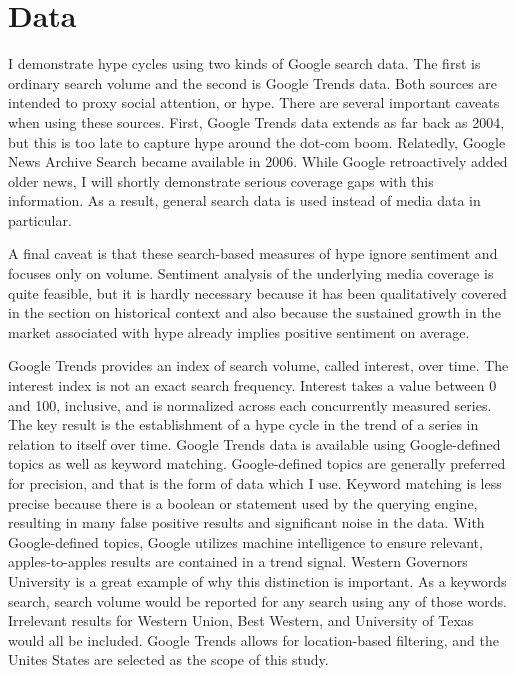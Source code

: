 \documentclass[review]{elsarticle}
\begin{document}
\section{Data}

I demonstrate hype cycles using two kinds of Google search data.
The first is ordinary search volume and the second is Google Trends data.
Both sources are intended to proxy social attention, or hype.
There are several important caveats when using these sources.
First, Google Trends data extends as far back as 2004,
but this is too late to capture hype around the dot-com boom.
Relatedly, Google News Archive Search became available in 2006.
While Google retroactively added older news, I will shortly demonstrate serious coverage gaps with this information.
As a result, general search data is used instead of media data in particular.

A final caveat is that these search-based measures of hype ignore sentiment and focuses only on volume.
Sentiment analysis of the underlying media coverage is quite feasible,
but it is hardly necessary because it has been qualitatively covered in the section on historical context
and also because the sustained growth in the market associated with hype already implies positive sentiment on average.

Google Trends provides an index of search volume, called interest, over time.
The interest index is not an exact search frequency.
Interest takes a value between 0 and 100, inclusive, and is normalized across each concurrently measured series.
The key result is the establishment of a hype cycle in the trend of a series in relation to itself over time.
Google Trends data is available using Google-defined topics as well as keyword matching.
Google-defined topics are generally preferred for precision, and that is the form of data which I use.
Keyword matching is less precise because there is a boolean or statement used by the querying engine, resulting in many false positive results and significant noise in the data.
With Google-defined topics, Google utilizes machine intelligence to ensure relevant, apples-to-apples results are contained in a trend signal.
Western Governors University is a great example of why this distinction is important.
As a keywords search, search volume would be reported for any search using any of those words.
Irrelevant results for Western Union, Best Western, and University of Texas would all be included.
Google Trends allows for location-based filtering, and the Unites States are selected as the scope of this study.
\end{document}
